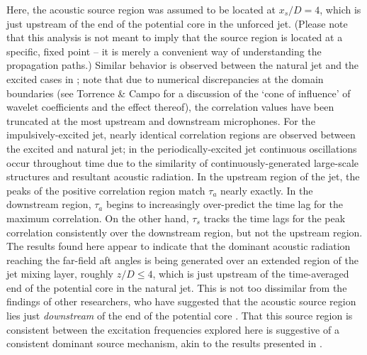 Here, the acoustic source region was assumed to be located at $x_s /D = 4$, which is just upstream of the end of the potential core in the unforced jet. 
(Please note that this analysis is not meant to imply that the source region is located at a specific, fixed point – it is merely a convenient way of understanding the propagation paths.)
Similar behavior is observed between the natural jet and the excited cases in ; note that due to numerical discrepancies at the domain boundaries (see Torrence \& Campo \citep{Torrence1998} for a discussion of the `cone of influence' of wavelet coefficients and the effect thereof), the correlation values have been truncated at the most upstream and downstream microphones.
For the impulsively-excited jet, nearly identical correlation regions are observed between the excited and natural jet; in the periodically-excited jet continuous oscillations occur throughout time due to the similarity of continuously-generated large-scale structures and resultant acoustic radiation.
In the upstream region of the jet, the peaks of the positive correlation region match $\tau_a$ nearly exactly. 
In the downstream region, $\tau_a$ begins to increasingly over-predict the time lag for the maximum correlation. 
On the other hand, $\tau_s$ tracks the time lags for the peak correlation consistently over the downstream region, but not the upstream region. 
The results found here appear to indicate that the dominant acoustic radiation reaching the far-field aft angles is being generated over an extended region of the jet mixing layer, roughly $z/D \leq 4$, which is just upstream of the time-averaged end of the potential core in the natural jet.
This is not too dissimilar from the findings of other researchers, who have suggested that the acoustic source region lies just \textit{downstream} of the end of the potential core \citep{Hileman2005}.
That this source region is consistent between the excitation frequencies explored here is suggestive of a consistent dominant source mechanism, akin to the results presented in .
